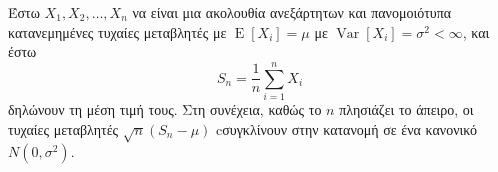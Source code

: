 \documentclass{article}
\newcommand{\gr}{\selectlanguage{greek}}
\begin{document}
\gr
Έστω $X_1, X_2, \ldots, X_n$ να είναι μια ακολουθία ανεξάρτητων και
πανομοιότυπα κατανεμημένες τυχαίες μεταβλητές με
$\operatorname{E}[X_i] = \mu$ με
$\operatorname{Var}[X_i] = \sigma^2 < \infty$, και έστω
\begin{equation*}
S_n = \frac{1}{n}\sum_{i=1}^{n} X_i
\end{equation*}
δηλώνουν τη μέση τιμή τους. Στη συνέχεια, καθώς το $n$ πλησιάζει το άπειρο, οι τυχαίες μεταβλητές $\sqrt{n}(S_n - \mu)$ cσυγκλίνουν στην κατανομή σε ένα κανονικό $N(0, \sigma^2)$.

\end{document}
